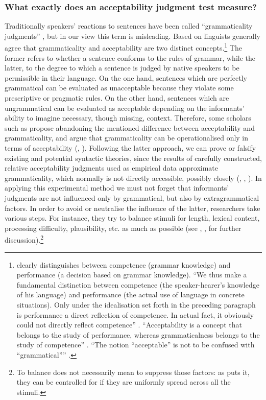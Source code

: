 \subsubsection{What exactly does an acceptability judgment test measure?}
\largerpage%
Traditionally speakers’ reactions to sentences have been called ``grammaticality judgments'' \citep[27]{SchutzeSprouse13}, but in our view this term is misleading. Based on \citet[4, 11f]{Chomsky65} linguists generally agree that grammaticality and acceptability are two distinct concepts.\footnote{\citet{Chomsky65} clearly distinguishes between competence (grammar knowledge) and performance (a decision based on grammar knowledge). “We thus make a fundamental distinction between competence (the speaker-hearer’s knowledge of his language) and performance (the actual use of language in concrete situations). Only under the idealisation set forth in the preceding paragraph is performance a direct reflection of competence. In actual fact, it obviously could not directly reflect competence” \citep[4]{Chomsky65}. “Acceptability is a concept that belongs to the study of performance, whereas grammaticalness belongs to the study of competence” \citep[11]{Chomsky65}. “The notion “acceptable” is not to be confused with “grammatical”''  \citep[11]{Chomsky65}.} The former refers to whether a sentence conforms to the rules of grammar, while the latter, to the degree to which a sentence is judged by native speakers to be permissible in their language. On the one hand, sentences which are perfectly grammatical can be evaluated as unacceptable because they violate some prescriptive or pragmatic rules. On the other hand, sentences which are ungrammatical can be evaluated as acceptable depending on the informants’ ability to imagine necessary, though missing, context. Therefore, some scholars such as \citet[701f]{Featherston05} propose abandoning the mentioned difference between acceptability and grammaticality, and argue that grammaticality can be operationalised only in terms of acceptability (\citealt[cf.][674, 701f]{Featherston05}, \citealt[624]{Riemer09}). 
Following the latter approach, we can prove or falsify existing and potential syntactic theories, since the results of carefully constructed, relative acceptability judgments used as empirical data approximate grammaticality, which normally is not directly accessible, possibly closely (\citealt[51]{Newmeyer83}, \citealt[26]{Schutze16}, \citealt[402f]{Featherston07}). In applying this experimental method we must not forget that  informants’ judgments are not influenced only by grammatical, but also by extragrammatical factors. In order to avoid or neutralise the influence of the latter, researchers take various steps. For instance, they try to balance stimuli for length, lexical content, processing difficulty, plausibility, etc. as much as possible (see \citealt{Schutze16}, \citealt{Cowart97}, \citealt{Featherston05} for further discussion).\footnote{To balance does not necessarily mean to suppress those factors: as \citet[47]{Cowart97} puts it, they can be controlled for if they are uniformly spread across all the stimuli.}

